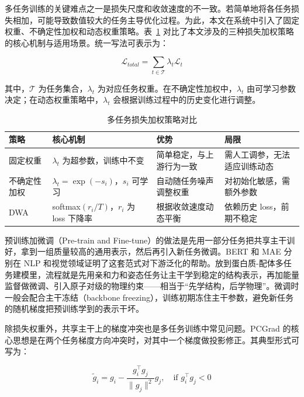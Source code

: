 多任务训练的关键难点之一是损失尺度和收敛速度的不一致\cite{kendall2018multi,chen2018gradnorm}。若简单地将各任务损失相加，可能导致数值较大的任务主导优化过程。为此，本文在系统中引入了固定权重、不确定性加权和动态权重策略。表~\ref{T.mtl_strategies} 对比了本文涉及的三种损失加权策略的核心机制与适用场景。统一写法可表示为：

\begin{equation}
 \mathcal{L}_{total} = \sum_{t \in \mathcal{T}} \lambda_t \mathcal{L}_t
\end{equation}

其中，$\mathcal{T}$ 为任务集合，$\lambda_t$ 为对应任务权重。在不确定性加权中，$\lambda_t$ 由可学习参数决定\cite{kendall2018multi}；在动态权重策略中，$\lambda_t$ 会根据训练过程中的历史变化进行调整\cite{liu2019end}。

\begin{table}[hbt]
  \centering
  \caption{多任务损失加权策略对比}
  \label{T.mtl_strategies}
  \small
  \begin{tabular}{p{2.0cm}p{3.5cm}p{3.5cm}p{2.5cm}}
    \toprule
    策略 & 核心机制 & 优势 & 局限 \\
    \midrule
    固定权重 & $\lambda_t$ 为超参数，训练中不变 & 简单稳定，与上游行为一致 & 需人工调参，无法适应训练动态 \\
    不确定性加权\cite{kendall2018multi} & $\lambda_t = \exp(-s_i)$，$s_i$ 可学习 & 自动随任务噪声调整权重 & 对初始化敏感，需额外参数 \\
    DWA\cite{liu2019end} & softmax$(r_i / T)$，$r_i$ 为 loss 下降率 & 根据收敛速度动态平衡 & 依赖历史 loss，前期不稳定 \\
    \bottomrule
  \end{tabular}
\end{table}

预训练加微调（Pre-train and Fine-tune）的做法是先用一部分任务把共享主干训好，拿到一组质量较高的通用表示，然后再引入新任务微调。BERT\cite{devlin2019bert} 和 MAE\cite{he2022mae} 分别在 NLP 和视觉领域证明了这套范式对下游泛化的帮助。放到蛋白质-配体多任务建模里，流程就是先用亲和力和姿态任务让主干学到稳定的结构表示，再加能量监督做微调、引入原子对级的物理约束——相当于“先学结构，后学物理”。微调时一般会配合主干冻结（backbone freezing），训练初期冻住主干参数，避免新任务的随机梯度把预训练学到的表示干坏。

除损失权重外，共享主干上的梯度冲突也是多任务训练中常见问题\cite{yu2020gradient}。PCGrad 的核心思想是在两个任务梯度方向冲突时，对其中一个梯度做投影修正。其典型形式可写为：

\begin{equation}
 \tilde{g}_i = g_i - \frac{g_i^\top g_j}{\|g_j\|^2} g_j, \quad \text{if } g_i^\top g_j < 0
\end{equation}

